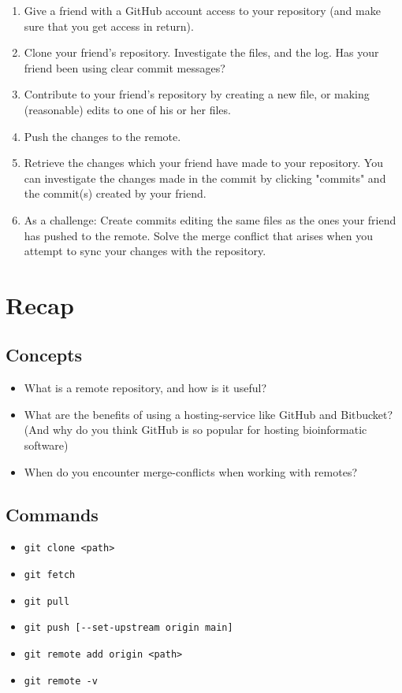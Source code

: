 \documentclass[../main/git_course_main.tex]{subfiles}
\begin{document}
	\begin{enumerate}
		\item Give a friend with a GitHub account access to your repository (and make sure that you get access in return).
		\item Clone your friend's repository. Investigate the files, and the log. Has your friend been using clear commit messages?
		\item Contribute to your friend's repository by creating a new file, or making (reasonable) edits to one of his or her files.
		\item Push the changes to the remote.
		\item Retrieve the changes which your friend have made to your repository. You can investigate the changes made in the commit by clicking "commits" and the commit(s) created by your friend.
		\item As a challenge: Create commits editing the same files as the ones your friend has pushed to the remote. Solve the merge conflict that arises when you attempt to sync your changes with the repository.
	\end{enumerate}
	
	\newpage
	\section{Recap}
	
	\subsection{Concepts}
	
	\begin{itemize}
		\item What is a remote repository, and how is it useful?
		\item What are the benefits of using a hosting-service like GitHub and Bitbucket? (And why do you think GitHub is so popular for hosting bioinformatic software)
		\item When do you encounter merge-conflicts when working with remotes?
	\end{itemize}
	
	\subsection{Commands}
	
	\begin{itemize}
		\item \verb$git clone <path>$
		\item \verb$git fetch$
		\item \verb$git pull$
		\item \verb$git push [--set-upstream origin main]$
		\item \verb$git remote add origin <path>$
		\item \verb$git remote -v$
	\end{itemize}
	
\end{document}
